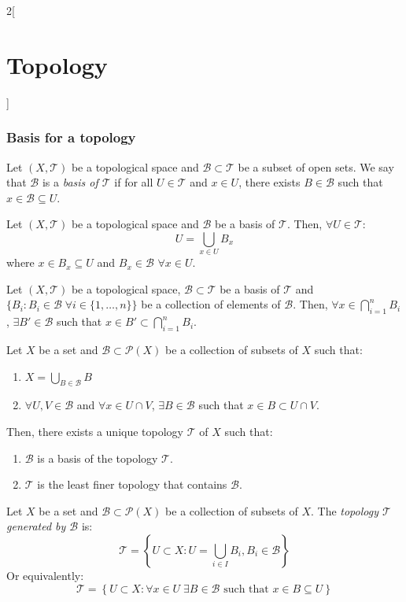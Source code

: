\documentclass[../../../main.tex]{subfiles}
\begin{document}
\begin{multicols}{2}[\section{Topology}]
  \subsubsection*{Basis for a topology}
  \begin{definition}
    Let $(X,\mathcal{T})$ be a topological space and $\mathcal{B}\subset\mathcal{T}$ be a subset of open sets. We say that $\mathcal{B}$ is a \textit{basis of $\mathcal{T}$} if for all $U\in\mathcal{T}$ and $x\in U$, there exists $B\in\mathcal{B}$ such that $x\in\mathcal{B}\subseteq U$.
  \end{definition}
  \begin{prop}
    Let $(X,\mathcal{T})$ be a topological space and $\mathcal{B}$ be a basis of $\mathcal{T}$. Then, $\forall U\in\mathcal{T}$: $$U=\bigcup_{x\in U}B_x$$ where $x\in B_x\subseteq U$ and $B_x\in\mathcal{B}$ $\forall x\in U$.
  \end{prop}
  \begin{lemma}
    Let $(X,\mathcal{T})$ be a topological space, $\mathcal{B}\subset\mathcal{T}$ be a basis of $\mathcal{T}$ and $\{B_i:B_i\in\mathcal{B}\;\forall i\in \{1,\ldots,n\}\}$ be a collection of elements of $\mathcal{B}$. Then, $\forall x\in\bigcap_{i=1}^nB_i$, $\exists B'\in\mathcal{B}$ such that $x\in B'\subset\bigcap_{i=1}^nB_i$.
  \end{lemma}
  \begin{prop}
    Let $X$ be a set and $\mathcal{B}\subset\mathcal{P}(X)$ be a collection of subsets of $X$ such that:
    \begin{enumerate}
      \renewcommand{\labelenumi}{\alph{enumi})}
      \item $\displaystyle X=\bigcup_{B\in\mathcal{B}} B$
      \item $\forall U,V\in\mathcal{B}$ and  $\forall x\in U\cap V$, $\exists B\in\mathcal{B}$ such that $x\in B\subset U\cap V$.
    \end{enumerate}
    Then, there exists a unique topology $\mathcal{T}$ of $X$ such that:
    \begin{enumerate}
      \item $\mathcal{B}$ is a basis of the topology $\mathcal{T}$.
      \item $\mathcal{T}$ is the least finer topology that contains $\mathcal{B}$.
    \end{enumerate}
  \end{prop}
  \begin{definition}
    Let $X$ be a set and $\mathcal{B}\subset\mathcal{P}(X)$ be a collection of subsets of $X$. The \textit{topology $\mathcal{T}$ generated by $\mathcal{B}$} is: $$\mathcal{T}=\left\{U\subset X:U=\bigcup_{i\in I}B_i, B_i\in \mathcal{B}\right\}$$ Or equivalently: $$\mathcal{T}=\left\{U\subset X:\forall x\in U\;\exists B\in\mathcal{B}\text{ such that }x\in B\subseteq U\right\}$$

\end{definition}
\end{multicols}
\end{document}

